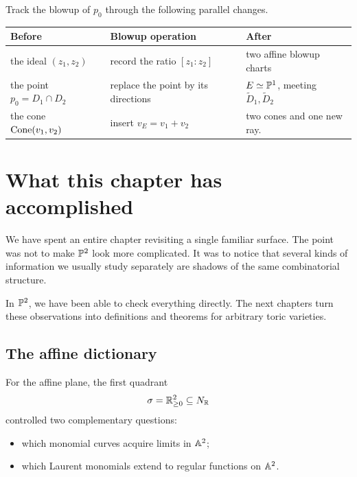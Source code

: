 \begin{surfacelaboratory}
Track the blowup of \(p_0\) through the following parallel changes.

\begin{center}
\small
\begin{tabularx}{\linewidth}{@{}
  >{\raggedright\arraybackslash}X
  >{\raggedright\arraybackslash}X
  >{\raggedright\arraybackslash}X@{}}
\toprule
\textbf{Before}
&
\textbf{Blowup operation}
&
\textbf{After}
\\
\midrule
the ideal \((z_1,z_2)\)
&
record the ratio \([z_1:z_2]\)
&
two affine blowup charts
\\[1mm]
the point \(p_0=D_1\cap D_2\)
&
replace the point by its directions
&
\(E\simeq\mathbb{P}^1\), meeting
\(\widetilde D_1,\widetilde D_2\)
\\[1mm]
the cone \(\operatorname{Cone}(v_1,v_2)\)
&
insert \(v_E=v_1+v_2\)
&
two cones and one new ray.
\\
\bottomrule
\end{tabularx}
\end{center}
\end{surfacelaboratory}


\section*{What this chapter has accomplished}
\label{sec:p2-predictions}

We have spent an entire chapter revisiting a single familiar surface.
The point was not to make \(\mathbb{P}^2\) look more complicated. It was to
notice that several kinds of information we usually study separately
are shadows of the same combinatorial structure.

In \(\mathbb{P}^2\), we have been able to check everything directly. The
next chapters turn these observations into definitions and theorems
for arbitrary toric varieties.

\subsection*{The affine dictionary}

For the affine plane, the first quadrant
\[
\sigma=\mathbb{R}_{\geq0}^2\subseteq N_{\mathbb{R}}
\]
controlled two complementary questions:

\begin{itemize}
\item which monomial curves acquire limits in \(\mathbb{A}^2\);
\item which Laurent monomials extend to regular functions on
\(\mathbb{A}^2\).
\end{itemize}

